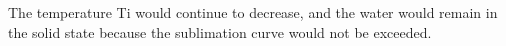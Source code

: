The temperature Ti would continue to decrease, and the water would remain in the solid state because the sublimation curve would not be exceeded.